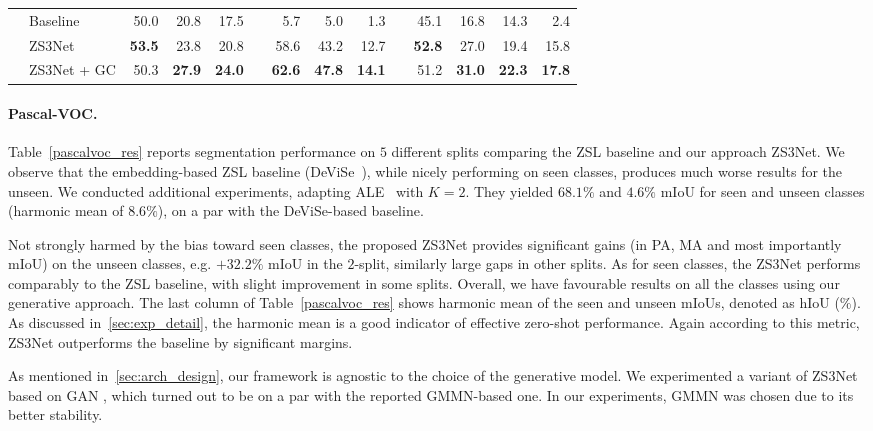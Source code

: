 \documentclass{article}
\begin{document}
\begin{table}
{\begin{tabular}{clrrrrrrrrrrrr}
\hline\noalign{\smallskip}
\multirow{4}{*}{10} & Baseline & 50.0 & 20.8  & 17.5 && 5.7 & 5.0 & 1.3 &&  45.1 & 16.8 & 14.3 & 2.4  \\ 
&  ZS3Net  & \bf 53.5 &   23.8 &  20.8  &&  58.6   &   43.2  &  12.7 && \bf 52.8  &  27.0  &  19.4 &  15.8 \\
&  ZS3Net + GC  & 50.3 & \bf 27.9   & \bf 24.0 && \bf 62.6  &  \bf 47.8  & \bf 14.1 && 51.2 & \bf 31.0 & \bf 22.3 & \bf  17.8 \\ \hline
\end{tabular}
}
\vspace{-0.4cm}
\label{pascalcontext_res}
\end{table}

\paragraph{Pascal-VOC.} Table~\ref{pascalvoc_res} reports segmentation performance on $5$ different splits comparing the ZSL baseline and our approach ZS3Net.
We observe that the embedding-based ZSL baseline (DeViSe~\cite{frome2013devise}), while nicely performing on seen classes, produces much worse results for the unseen. 
We conducted additional experiments, adapting ALE~\cite{akata2015label} with $K=2$.
They yielded $68.1\%$ and $4.6\%$ mIoU for seen and unseen classes (harmonic mean of $8.6\%$), on a par with the DeViSe-based baseline.

Not strongly harmed by the bias toward seen classes, the proposed ZS3Net provides significant gains (in PA, MA and most importantly mIoU) on the unseen classes, e.g. $+32.2\%$ mIoU in the $2$-split, similarly large gaps in other splits.
As for seen classes, the ZS3Net performs comparably to the ZSL baseline, with slight improvement in some splits.
Overall, we have favourable results on all the classes using our generative approach.
The last column of Table~\ref{pascalvoc_res} shows harmonic mean of the seen and unseen mIoUs, denoted as hIoU ($\%$).
As discussed in~\ref{sec:exp_detail}, the harmonic mean is a good indicator of effective zero-shot performance.
Again according to this metric, ZS3Net outperforms the baseline by significant margins.


As mentioned in~\ref{sec:arch_design}, our framework is agnostic to the choice of the generative model.
We experimented a variant of ZS3Net based on GAN \cite{xian2018feature}, which turned out to be on a par with the reported GMMN-based one.
In our experiments, GMMN was chosen due to its better stability.
\end{document}
